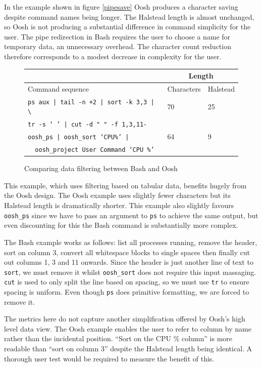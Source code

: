 \documentclass[12pt,twoside,notitlepage]{report}
\begin{document}
In the example shown in figure \ref{pipesave} Oosh produces a
character saving despite command names being longer. The Halstead
length is almost unchanged, so Oosh is not producing a substantial
difference in command simplicity for the user. The pipe
redirection in Bash requires the user to choose a name for temporary
data, an unnecessary overhead. The character count reduction therefore
corresponds to a modest decrease in complexity for the user.

\begin{figure}[h]
\begin{tabular}{|l|l|l|}
\cline{2-3}
\multicolumn{1}{l}{} & \multicolumn{2}{|c|}{Length} \\
\hline
Command sequence & Characters & Halstead \\
\hline
{\tt ps aux | tail -n +2 | sort -k 3,3 | \textbackslash} & 70 & 25\\
{\tt tr -s ` ' | cut -d " " -f 1,3,11-} & & \\
\hline
{\tt oosh\_ps | oosh\_sort `CPU\%' |} & 64 & 9 \\
{\tt \, oosh\_project User Command `CPU \%'} & & \\
\hline
\end{tabular}
\caption{Comparing data filtering between Bash and Oosh}
\end{figure}

This example, which uses filtering based on tabular data, benefits
hugely from the Oosh design. The Oosh example uses slightly fewer
characters but its Halstead length is dramatically shorter. This
example also slightly favours {\tt oosh\_ps} since we have to pass an
argument to {\tt ps} to achieve the same output, but even discounting
for this the Bash command is substantially more complex.

The Bash example works as follows: list all processes running, remove
the header, sort on column 3, convert all whitespace blocks to single
spaces then finally cut out columns 1, 3 and 11 onwards. Since the
header is just another line of text to {\tt sort}, we must remove it
whilst {\tt oosh\_sort} does not require this input massaging. {\tt
  cut} is used to only split the line based on spacing, so we must use
{\tt tr} to ensure spacing is uniform. Even though {\tt ps} does
primitive formatting, we are forced to remove it.

The metrics here do not capture another simplification offered by Oosh's high
level data view. The Oosh example enables the user to refer to column by name
rather than the incidental position. ``Sort on the CPU \% column'' is more
readable than ``sort on column 3'' despite the Halstead length being
identical. A thorough user test would be required to measure the benefit of
this.
\end{document}

